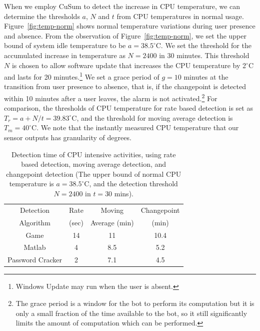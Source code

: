 When we employ CuSum to detect the increase in CPU temperature,
we can determine the thresholds $a$,
$N$ and $t$ from CPU temperatures in normal usage.
Figure~\ref{fig:temp-norm} shows normal temperature variations during user
presence and absence. From the observation of Figure~\ref{fig:temp-norm},
we set the upper bound of system idle
temperature to be $a=38.5^\circ$C. We set the threshold for
the accumulated increase in temperature as $N=2400$ in 30 minutes.
This threshold $N$ is chosen to allow software update that increases
the CPU temperature by 2$^\circ$C and lasts for 20 minutes.\footnote{
Windows Update may run when the user is absent.
}
We set a grace period of $g=10$ minutes at the transition
from user presence to absence, that is, if the changepoint is
detected within 10 minutes after a user leaves, the alarm is not
activated.\footnote{
The grace period is a window for the bot to perform its computation but
it is only a small fraction of the time available to the bot, so it still
significantly limits the amount of computation which can be performed.
}
For comparison, the thresholds of CPU temperature for rate based detection is set as $T_r = a + N/t = 39.83^\circ$C, and the threshold for moving average detection is $T_m = 40^\circ$C. We note that the instantly measured CPU temperature that our sensor outputs has granularity of degrees.

\begin{table}[tb]
\centering
\begin{tabular}{|c|c|c|c|}
\hline
Detection & Rate & Moving & Changepoint \\
Algorithm & (sec) & Average (min) & (min) \\
\hline
Game            & 14 & 11  & 10.4   \\
\hline
Matlab           & 4 & 8.5 & 5.2   \\
\hline
Password Cracker & 2 & 7.1 & 4.5   \\ [0.5ex]
\hline
\end{tabular}
\caption{Detection time of CPU intensive activities,
using rate based detection, moving average detection,
and changepoint detection (The upper bound of normal CPU temperature
is $a=38.5^\circ$C,
and the detection threshold $N=2400$ in $t=30$ mins).}
\label{tbl:detect-CPU}
\end{table}

